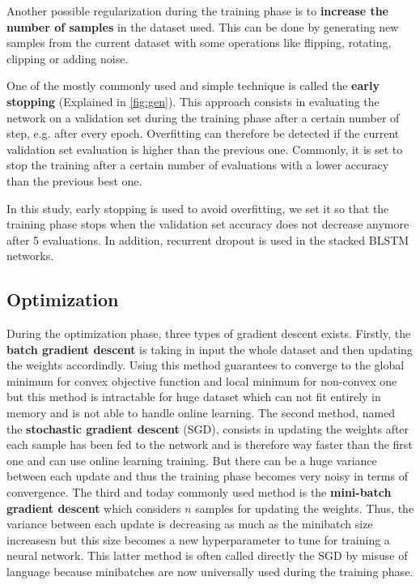 \documentclass[master, tikz, final,11pt, dvipdfmx]{iscs-thesis}
\begin{document}
Another possible regularization during the training phase is to \textbf{increase the number of samples} in the dataset used. This can be done by generating new samples from the current dataset with some operations like flipping, rotating, clipping or adding noise.

One of the mostly commonly used and simple technique is called the \textbf{early stopping} (Explained in \autoref{fig:gen}). This approach consists in evaluating the network on a validation set during the training phase after a certain number of step, e.g. after every epoch. Overfitting can therefore be detected if the current validation set evaluation is higher than the previous one. Commonly, it is set to stop the training after a certain number of evaluations with a lower accuracy than the previous best one. 

In this study, early stopping is used to avoid overfitting, we set it so that the training phase stops when the validation set accuracy does not decrease anymore after 5 evaluations. In addition, recurrent dropout is used in the stacked BLSTM networks.

\subsection{Optimization}

During the optimization phase, three types of gradient descent exists. Firstly, the \textbf{batch gradient descent} is taking in input the whole dataset and then updating the weights accordindly. Using this method guarantees to converge to the global minimum for convex objective function and local minimum for non-convex one but this method is intractable for huge dataset which can not fit entirely in memory and is not able to handle online learning. The second method, named the \textbf{stochastic gradient descent} (SGD), consists in updating the weights after each sample has been fed to the network and is therefore way faster than the first one and can use online learning training. But there can be a huge variance between each update and thus the training phase becomes very noisy in terms of convergence. The third and today commonly used method is the \textbf{mini-batch gradient descent} which considers $n$ samples for updating the weights. Thus, the variance between each update is decreasing as much as the minibatch size increasesn but this size becomes a new hyperparameter to tune for training a neural network. This latter method is often called directly the SGD by misuse of language because minibatches are now universally used during the training phase.
\end{document}
